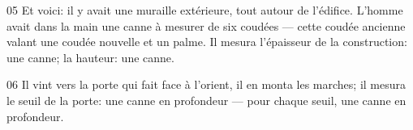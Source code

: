 
05 Et voici: il y avait une muraille extérieure, tout autour de l’édifice. L’homme avait dans la main une canne à mesurer de six coudées --- cette coudée ancienne valant une coudée nouvelle et un palme. Il mesura l’épaisseur de la construction: une canne; la hauteur: une canne.

06 Il vint vers la porte qui fait face à l’orient, il en monta les marches; il mesura le seuil de la porte: une canne en profondeur --- pour chaque seuil, une canne en profondeur.